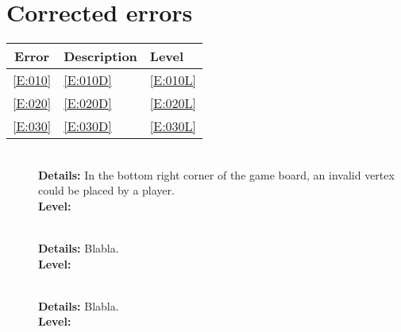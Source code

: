 \section{Corrected errors}

\begin{tabular}{cll}

\hline
	\textbf{Error} & \textbf{Description} & \textbf{Level} \\
	\hline
	\ref{E:010} & \ref{E:010D} & \ref{E:010L} \\
	\ref{E:020} & \ref{E:020D} & \ref{E:020L} \\
	\ref{E:030} & \ref{E:030D} & \ref{E:030L} \\
	\hline
\end{tabular}

\begin{description}
	\item[] \textbf{} \\
	\textbf{Details:} In the bottom right corner of the \twixt game board, an invalid vertex could be placed by a player. \\
	\textbf{Level:} 

	\item[] \textbf{} \\
	\textbf{Details:} Blabla. \\
	\textbf{Level:} 

	\item[] \textbf{} \\
	\textbf{Details:} Blabla. \\
	\textbf{Level:} 
\end{description}

